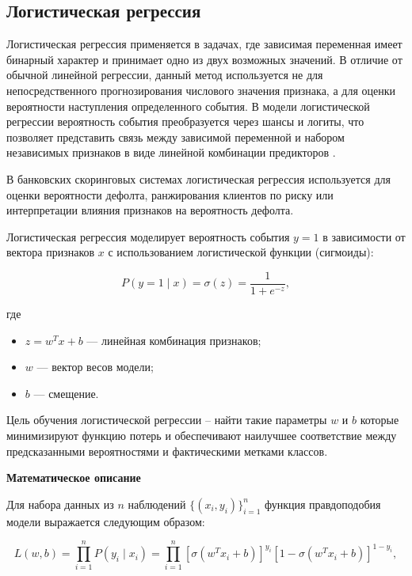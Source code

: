 
\subsection{Логистическая регрессия}

Логистическая регрессия применяется в задачах, где зависимая переменная имеет бинарный характер и принимает одно из двух возможных значений. В отличие от обычной линейной регрессии, данный метод используется не для непосредственного прогнозирования числового значения признака, а для оценки вероятности наступления определенного события. В модели логистической регрессии вероятность события преобразуется через шансы и логиты, что позволяет представить связь между зависимой переменной и набором независимых признаков в виде линейной комбинации предикторов \cite{PampelLogisticRegression}.

В банковских скоринговых системах логистическая регрессия используется для оценки вероятности дефолта, ранжирования клиентов по риску или интерпретации влияния признаков на вероятность дефолта.

Логистическая регрессия моделирует вероятность события $y = 1$ в зависимости от вектора признаков $x$ с использованием логистической функции (сигмоиды):

\begin{equation}
  P(y = 1 \mid x) = \sigma(z) = \frac{1}{1 + e^{-z}},
\end{equation}

где

\begin{itemize}
  \item $z = w^T x + b$ --- линейная комбинация признаков;
  \item $w$ --- вектор весов модели;
  \item $b$ --- смещение.
\end{itemize}

Цель обучения логистической регрессии -- найти такие параметры $w$ и $b$ которые минимизируют функцию потерь и обеспечивают наилучшее соответствие между предсказанными вероятностями и фактическими метками классов.

\textbf{Математическое описание}

Для набора данных из $n$ наблюдений $\{(x_i, y_i)\}_{i=1}^{n}$ функция правдоподобия модели выражается следующим образом:

\begin{equation}
  L(w, b) = \prod_{i=1}^{n} P(y_i \mid x_i) =
  \prod_{i=1}^{n} \left[\sigma(w^T x_i + b)\right]^{y_i}
  \left[1 - \sigma(w^T x_i + b)\right]^{1 - y_i},
\end{equation}

